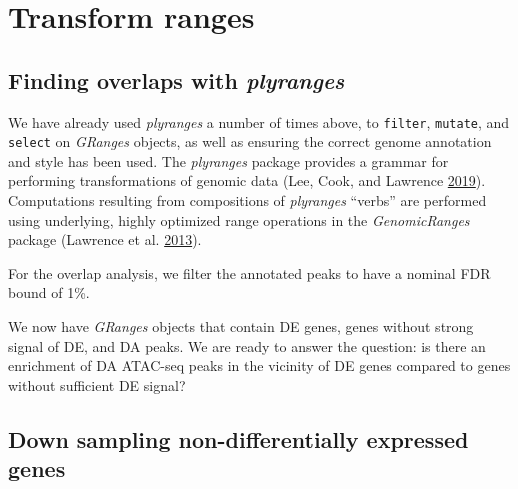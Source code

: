 \documentclass[
]{article}
\newenvironment{Shaded}{}{}
\newcommand{\FloatTok}[1]{\textcolor[rgb]{0.25,0.63,0.44}{#1}}
\newcommand{\KeywordTok}[1]{\textcolor[rgb]{0.00,0.44,0.13}{\textbf{#1}}}
\newcommand{\NormalTok}[1]{#1}
\newcommand{\OperatorTok}[1]{\textcolor[rgb]{0.40,0.40,0.40}{#1}}
\newcommand{\StringTok}[1]{\textcolor[rgb]{0.25,0.44,0.63}{#1}}
\begin{document}
\hypertarget{transform-ranges}{%
\section{Transform ranges}\label{transform-ranges}}

\hypertarget{finding-overlaps-with-plyranges}{%
\subsection{\texorpdfstring{Finding overlaps with \emph{plyranges}}{Finding overlaps with plyranges}}\label{finding-overlaps-with-plyranges}}

We have already used \emph{plyranges} a number of times above, to \texttt{filter}, \texttt{mutate},
and \texttt{select} on \emph{GRanges} objects, as well as ensuring the correct genome
annotation and style has been used. The \emph{plyranges} package provides a grammar
for performing transformations of genomic data (Lee, Cook, and Lawrence \protect\hyperlink{ref-Lee2019}{2019}). Computations
resulting from compositions of \emph{plyranges} ``verbs'' are performed using
underlying, highly optimized range operations in the \emph{GenomicRanges} package
(Lawrence et al. \protect\hyperlink{ref-granges}{2013}).

For the overlap analysis, we filter the annotated peaks to have a nominal FDR
bound of 1\%.

\begin{Shaded}
\end{Shaded}

We now have \emph{GRanges} objects that contain DE genes, genes without strong
signal of DE, and DA peaks. We are ready to answer the question: is there an
enrichment of DA ATAC-seq peaks in the vicinity of DE genes compared to genes
without sufficient DE signal?

\hypertarget{down-sampling-non-differentially-expressed-genes}{%
\subsection{Down sampling non-differentially expressed genes}\label{down-sampling-non-differentially-expressed-genes}}
\end{document}
